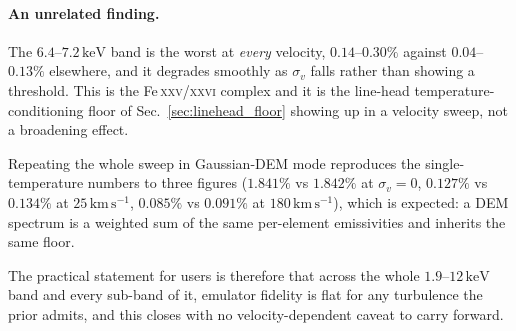 \documentclass[11pt,a4paper]{article}
\newcommand{\kev}{\,\mathrm{keV}}
\newcommand{\kms}{\,\mathrm{km\,s^{-1}}}
\begin{document}
\paragraph{An unrelated finding.} The $6.4$--$7.2\kev$ band is the worst
at \emph{every} velocity, $0.14$--$0.30\%$ against $0.04$--$0.13\%$
elsewhere, and it degrades smoothly as $\sigma_v$ falls rather than
showing a threshold. This is the Fe\,\textsc{xxv}/\textsc{xxvi} complex
and it is the line-head temperature-conditioning floor of
Sec.~\ref{sec:linehead_floor} showing up in a velocity sweep, not a
broadening effect.

Repeating the whole sweep in Gaussian-DEM mode reproduces the
single-temperature numbers to three figures ($1.841\%$ vs $1.842\%$ at
$\sigma_v = 0$, $0.127\%$ vs $0.134\%$ at $25\kms$, $0.085\%$ vs
$0.091\%$ at $180\kms$), which is expected: a DEM spectrum is a weighted
sum of the same per-element emissivities and inherits the same floor.

The practical statement for users is therefore that across the whole
$1.9$--$12\kev$ band and every sub-band of it, emulator fidelity is flat
for any turbulence the prior admits, and this closes with no
velocity-dependent caveat to carry forward.
\end{document}
